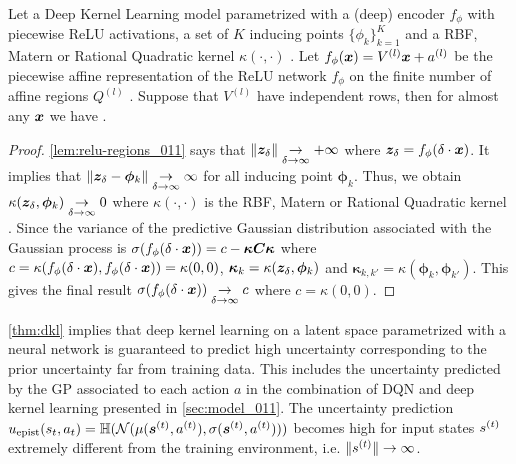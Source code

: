 \begin{theorem}
\label{thm:dkl}
Let a Deep Kernel Learning model parametrized with a (deep) encoder $f_{\phi}$ with piecewise ReLU activations, a set of $K$ inducing points $\{\phi_{k}\}_{k=1}^{K}$ and a RBF, Matern or Rational Quadratic kernel $\kappa(\cdot, \cdot)$ \citep{expressing-structure-kernels, gp-for-ml}. Let $f_{\phi}(\bm{x})= V^{(l)}\bm{x} + a^{(l)}$ be the piecewise affine representation of the ReLU network $f_{\phi}$ on the finite number of affine regions $Q^{(l)}$ \citep{understanding-nn-relu}. Suppose that $V^{(l)}$ have independent rows, then for almost any $\bm{x}$ we have .
\end{theorem}

\begin{proof}
\cref{lem:relu-regions_011} says that $\lVert \bm{z}_\delta \rVert \underset{\delta \rightarrow \infty}{\rightarrow} + \infty$ where $\bm{z}_\delta=f_{\phi}(\delta \cdot \bm{x})$. It implies that $\|\bm{z}_\delta - \bm{\phi}_k\| \underset{\delta \rightarrow \infty}{\rightarrow} \infty$ for all inducing point $\bm{\phi}_k$. Thus, we obtain $\kappa(\bm{z}_\delta, \bm{\phi}_k) \underset{\delta \rightarrow \infty}{\rightarrow} 0$ where $\kappa(\cdot, \cdot)$ is the RBF, Matern or Rational Quadratic kernel \citep{expressing-structure-kernels, gp-for-ml}. Since the variance of the predictive Gaussian distribution associated with the Gaussian process is $\sigma(f_{\phi}(\delta \cdot \bm{x})) = c - \bm{\kappa} \bm{C} \bm{\kappa}$ where $c = \kappa(f_{\phi}(\delta \cdot \bm{x}), f_{\phi}(\delta \cdot \bm{x})) = \kappa(0, 0)$, $\bm{\kappa}_k = \kappa(\bm{z}_\delta, \bm{\phi}_{k})$ and $\bm{\kappa}_{k, k'} = \kappa(\bm{\phi}_{k}, \bm{\phi}_{k'})$. This gives the final result $\sigma(f_{\phi}(\delta \cdot \bm{x})) \underset{\delta \rightarrow \infty}{\rightarrow} c$ where $ c = \kappa(0, 0)$.
\end{proof}

\cref{thm:dkl} implies that deep kernel learning on a latent space parametrized with a neural network is guaranteed to predict high uncertainty corresponding to the prior uncertainty far from training data. This includes the uncertainty predicted by the GP associated to each action $a$ in the combination of DQN and deep kernel learning presented in \cref{sec:model_011}. The uncertainty prediction $u_\text{epist}(s_t, a_t) = \operatorname{\mathbb{H}}(\operatorname{\mathcal{N}}(\mu(\bm{s}^{(t)}, a^{(t)}), \sigma(\bm{s}^{(t)}, a^{(t)})))$ becomes high for input states $s^{(t)}$ extremely different from the training environment, i.e. $\|s^{(t)}\| \rightarrow \infty$.

